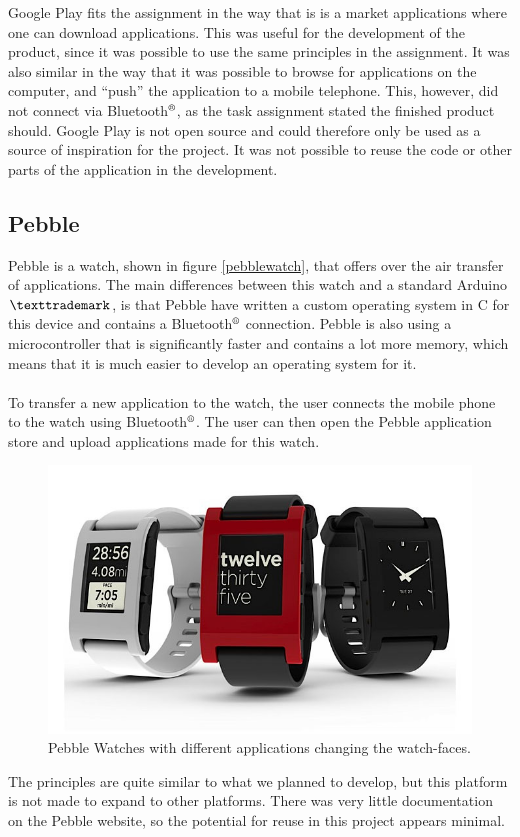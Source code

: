 Google Play fits the assignment in the way that is is a market applications where one can download applications. This was useful for the development of the product, since it was possible to use the same principles in the assignment. It was also similar in the way that it was possible to browse for applications on the computer, and ``push'' the application to a mobile telephone. This, however, did not connect via Bluetooth$\textsuperscript{\textregistered}$, as the task assignment stated the finished product should. Google Play is not open source and could therefore only be used as a source of inspiration for the project. It was not possible to reuse the code or other parts of the application in the development.



\subsection{Pebble}
Pebble is a watch, shown in figure \ref{pebblewatch}, that offers over the air transfer of applications. The main differences between this watch and a standard Arduino$\texttrademark$, is that Pebble have written a custom operating system in C for this device and contains a Bluetooth$\textsuperscript{\textregistered}$ connection. Pebble is also using a microcontroller that is significantly faster and contains a lot more memory, which means that it is much easier to develop an operating system for it.\\
\\
To transfer a new application to the watch, the user connects the mobile phone to the watch using Bluetooth$\textsuperscript{\textregistered}$. The user can then open the Pebble application store and upload applications made for this watch.

\begin{figure}[H]
\includegraphics[scale=0.7]{images/Pebble-Smartphone-Watch.jpeg}
\caption[Pebble Watch]{Pebble Watches with different applications changing the watch-faces.}
\label{fig:pebblewatch}
\end{figure}
The principles are quite similar to what we planned to develop, but this platform is not made to expand to other platforms. There was very little documentation on the Pebble website, so the potential for reuse in this project appears minimal.

